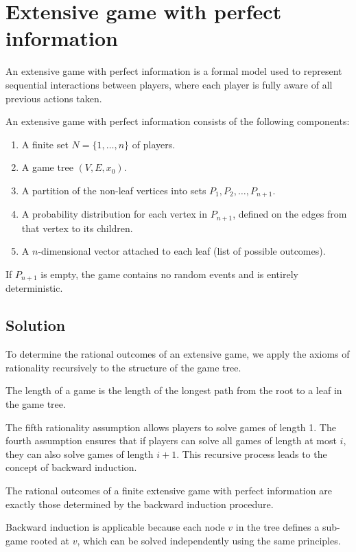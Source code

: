 \section{Extensive game with perfect information}

An extensive game with perfect information is a formal model used to represent sequential interactions between players, where each player is fully aware of all previous actions taken.
\begin{definition}
    An extensive game with perfect information consists of the following components:
    \begin{enumerate}
        \item A finite set $N = \{1,\dots,n\}$ of players. 
        \item A game tree $(V,E,x_0)$.
        \item A partition of the non-leaf vertices into sets ${P_1, P_2, \dots , P_{n+1}}$.
        \item A probability distribution for each vertex in $P_{n+1}$, defined on the edges from that vertex to its children.
        \item A $n$-dimensional vector attached to each leaf (list of possible outcomes). 
    \end{enumerate}
\end{definition}
\noindent If $P_{n+1}$ is empty, the game contains no random events and is entirely deterministic.

\subsection{Solution}
To determine the rational outcomes of an extensive game, we apply the axioms of rationality recursively to the structure of the game tree.
\begin{definition}
    The length of a game is the length of the longest path from the root to a leaf in the game tree.
\end{definition}
\noindent The fifth rationality assumption allows players to solve games of length 1. The fourth assumption ensures that if players can solve all games of length at most $i$, they can also solve games of length $i+1$. 
This recursive process leads to the concept of backward induction.
\begin{theorem}
    The rational outcomes of a finite extensive game with perfect information are exactly those determined by the backward induction procedure.
\end{theorem}
Backward induction is applicable because each node $v$ in the tree defines a sub-game rooted at $v$, which can be solved independently using the same principles.

